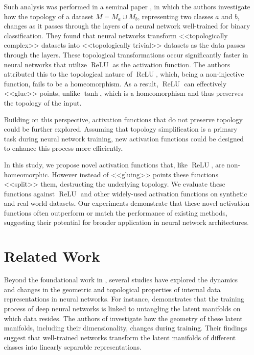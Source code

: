 \documentclass{esannV2}
\DeclareMathOperator{\relu}{\mathrm{ReLU}}
\begin{document}
Such analysis was performed in a seminal paper \cite{top_of_DNN}, in which the authors investigate how the topology of a dataset  $M = M_a \cup M_b$, representing two classes $a$ and $b$, changes as it passes through the layers of a neural network well-trained for binary classification. They found that neural networks transform <<topologically complex>> datasets into <<topologically trivial>> datasets as the data passes through the layers. These topological transformations occur significantly faster in neural networks that utilize $\relu$ as the activation function. The authors attributed this to the topological nature of $\relu$, which, being a non-injective function, fails to be a homeomorphism. As a result, $\relu$ can effectively <<glue>> points, unlike $\tanh$, which is a homeomorphism and thus preserves the topology of the input.

Building on this perspective, activation functions that do not preserve topology could be further explored. Assuming that topology simplification is a primary task during neural network training, new activation functions could be designed to enhance this process more efficiently.

In this study, we propose novel activation functions that, like $\relu$, are non-homeomorphic. However instead of <<gluing>> points these functions <<split>> them, destructing the underlying topology. We evaluate these functions against $\relu$ and other widely-used activation functions on synthetic and real-world datasets. Our experiments demonstrate that these novel activation functions often outperform or match the performance of existing methods, suggesting their potential for broader application in neural network architectures.

\section{Related Work}
Beyond the foundational work in \cite{top_of_DNN}, several studies have explored the dynamics and changes in the geometric and topological properties of internal data representations in neural networks. For instance, \cite{why_DL_works} demonstrates that the training process of deep neural networks is linked to untangling the latent manifolds on which data resides. The authors of \cite{sep_and_geo} investigate how the geometry of these latent manifolds, including their dimensionality, changes during training. Their findings suggest that well-trained networks transform the latent manifolds of different classes into linearly separable representations.
\end{document}
